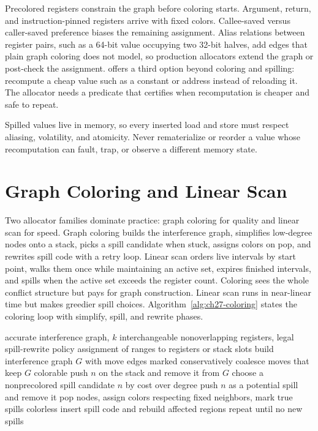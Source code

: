 Precolored registers constrain the graph before coloring starts.
Argument, return, and instruction-pinned registers arrive with fixed colors.
Callee-saved versus caller-saved preference biases the remaining assignment.
Alias relations between register pairs, such as a 64-bit value occupying two 32-bit halves, add edges that plain graph coloring does not model, so production allocators extend the graph or post-check the assignment.
 offers a third option beyond coloring and spilling: recompute a cheap value such as a constant or address instead of reloading it.
The allocator needs a predicate that certifies when recomputation is cheaper and safe to repeat.
\begin{ccwarning}
Spilled values live in memory, so every inserted load and store must respect aliasing, volatility, and atomicity.
Never rematerialize or reorder a value whose recomputation can fault, trap, or observe a different memory state.
\end{ccwarning}

\section{Graph Coloring and Linear Scan}\label{sec:ch27-algorithm}

Two allocator families dominate practice: graph coloring for quality and linear scan for speed.
Graph coloring builds the interference graph, simplifies low-degree nodes onto a stack, picks a spill candidate when stuck, assigns colors on pop, and rewrites spill code with a retry loop.
Linear scan orders live intervals by start point, walks them once while maintaining an active set, expires finished intervals, and spills when the active set exceeds the register count.
Coloring sees the whole conflict structure but pays for graph construction.
Linear scan runs in near-linear time but makes greedier spill choices.
Algorithm~\ref{alg:ch27-coloring} states the coloring loop with simplify, spill, and rewrite phases.

\begin{algorithm}[htbp]
\caption{Graph-coloring allocation with spill rewrite}\label{alg:ch27-coloring}
\begin{pseudocode}
\Require accurate interference graph, $k$ interchangeable nonoverlapping registers, legal spill-rewrite policy
\Ensure assignment of ranges to registers or stack slots
\State build interference graph $G$ with move edges marked
\State conservatively coalesce moves that keep $G$ colorable
\State push $n$ on the stack and remove it from $G$
\Else
\State choose a nonprecolored spill candidate $n$ by cost over degree
\State push $n$ as a potential spill and remove it
\EndIf
\EndWhile
\State pop nodes, assign colors respecting fixed neighbors, mark true spills colorless
\State insert spill code and rebuild affected regions
\State repeat until no new spills
\EndIf
\end{pseudocode}
\end{algorithm}


